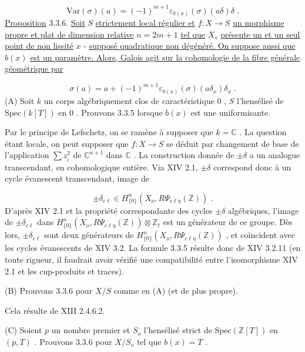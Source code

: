 \begin{equation*}
\mathrm{Var}(\sigma)(a) = (-1)^{m+1} \varepsilon_{b(x)}(\sigma)(a\delta)\delta \;.
\end{equation*}
\underline{Proposition} 3.3.6. \underline{Soit} $S$ \underline{strictement local régulier et} $f : X \to S$ \underline{un morphisme propre et plat de dimension relative} $n = 2m + 1$ \underline{tel que} $X_s$ \underline{présente un et un seul point de non lissité} $x$ - \underline{supposé quadratique non dégénéré. On suppose aussi que} $b(x)$ \underline{est un paramètre. Alors, Galois agit sur la cohomologie de la fibre générale géométrique par}

\begin{equation*}
\sigma(a) = a+(-1)^{m+1} \varepsilon_{b(x)}(\sigma)(a\delta_x)\delta_x \;.
\end{equation*}
(A) Soit $k$ un corps algébriquement clos de caractéristique $0$ , $S$ l'hensélisé
de $\mathrm{Spec}(k[T])$ en $0$ . Prouvons 3.3.5 lorsque $b(x)$ est une uniformisante.

Par le principe de Lefschetz, on se ramène à supposer que $k = \mathbb{C}$ . La question étant locale, on peut supposer que $f : X \to S$ se déduit par changement de base de l'application $\sum z_i^2$ de $\mathbb{C}^{n+1}$ dans $\mathbb{C}$ . La construction donnée de $\pm \delta$ a un analogue transcendant, en cohomologique entière. Via XIV 2.1, $\pm \delta$ correspond donc à un cycle évanescent transcendant, image de

\begin{equation*}
\pm \delta_{c\ell} \in H^{n}_{\{0\}}(X_o,R\Psi_{c\ell\eta}(\mathbb{Z})) \;.
\end{equation*}
D'après XIV 2.1 et la propriété correspondante des cycles $\pm \delta$ algébriques, l'image de $\pm \delta_{c\ell}$ dans $H^n_{\{0\}}(X_o,R\Psi_{c\ell\eta}(\mathbb{Z})) \otimes \mathbb{Z}_\ell$ est un générateur de ce groupe. Dès lors, $\pm \delta_{c\ell}$ sont deux générateurs de $H^n_{\{0\}}(X_o,R\Psi_{c\ell\eta}(\mathbb{Z}))$ , et coïncident avec les cycles évanescents de XIV 3.2. La formule 3.3.5 résulte donc de XIV 3.2.11 (en toute rigueur, il faudrait avoir vérifié une compatibilité entre l'isomorphisme XIV 2.1 et les cup-produits et traces).

(B) Prouvons 3.3.6 pour $X/S$ comme en (A) (et de plus propre).

Cela résulte de XIII 2.4.6.2.

(C) Soient $p$ un nombre premier et $S_o$ l'hensélisé strict de $\mathrm{Spec}(\mathbb{Z}[T])$ en $(p,T)$ . Prouvons 3.3.6 pour $X/S_o$ tel que $b(x) = T$ .

